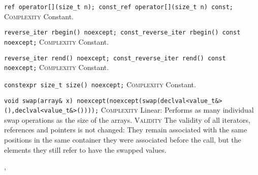 \noindent{}\hspace*{0.25em}\lstinline[basicstyle=\ttfamily\color{cgreen}]{ref operator[](size_t n); const_ref operator[](size_t n) const;} \textsc{Complexity} Constant.\\\vspace{-0.6em}

\noindent{}\hspace*{0.25em}\lstinline[basicstyle=\ttfamily\color{cgreen}]{reverse_iter rbegin() noexcept; const_reverse_iter rbegin() const noexcept;} \textsc{Complexity} Constant.\\\vspace{-0.6em}

\noindent{}\hspace*{0.25em}\lstinline[basicstyle=\ttfamily\color{cgreen}]{reverse_iter rend() noexcept; const_reverse_iter rend() const noexcept;} \textsc{Complexity} Constant.\\\vspace{-0.6em}

\noindent{}\hspace*{0.25em}\lstinline[basicstyle=\ttfamily\color{cgreen}]{constexpr size_t size() noexcept;} \textsc{Complexity} Constant.\\\vspace{-0.6em}

\noindent{}\hspace*{0.25em}\lstinline[basicstyle=\ttfamily\color{corange}]{void swap(array& x) noexcept(noexcept(swap(declval<value_t&>(),declval<value_t&>())));} \textsc{Complexity} Linear: Performs as many individual swap operations as the size of the arrays. \textsc{Validity} The validity of all iterators, references and pointers is not changed: They remain associated with the same positions in the same container they were associated before the call, but the elements they still refer to have the swapped values.\\\vspace{-0.6em}


\sep
{}
